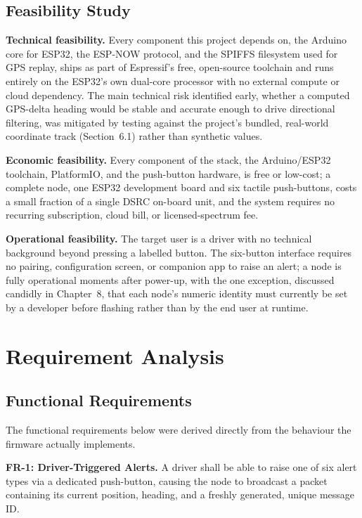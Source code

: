 \documentclass[12pt,a4paper]{report}
\begin{document}
\subsection{Feasibility Study}
\textbf{Technical feasibility.} Every component this project depends on, the Arduino core for ESP32, the ESP-NOW protocol, and the SPIFFS filesystem used for GPS replay, ships as part of Espressif's free, open-source toolchain and runs entirely on the ESP32's own dual-core processor with no external compute or cloud dependency. The main technical risk identified early, whether a computed GPS-delta heading would be stable and accurate enough to drive directional filtering, was mitigated by testing against the project's bundled, real-world coordinate track (Section~6.1) rather than synthetic values.

\textbf{Economic feasibility.} Every component of the stack, the Arduino/ESP32 toolchain, PlatformIO, and the push-button hardware, is free or low-cost; a complete node, one ESP32 development board and six tactile push-buttons, costs a small fraction of a single DSRC on-board unit, and the system requires no recurring subscription, cloud bill, or licensed-spectrum fee.

\textbf{Operational feasibility.} The target user is a driver with no technical background beyond pressing a labelled button. The six-button interface requires no pairing, configuration screen, or companion app to raise an alert; a node is fully operational moments after power-up, with the one exception, discussed candidly in Chapter~8, that each node's numeric identity must currently be set by a developer before flashing rather than by the end user at runtime.

\section{Requirement Analysis}

\subsection{Functional Requirements}
The functional requirements below were derived directly from the behaviour the firmware actually implements.

\textbf{FR-1: Driver-Triggered Alerts.} A driver shall be able to raise one of six alert types via a dedicated push-button, causing the node to broadcast a packet containing its current position, heading, and a freshly generated, unique message ID.
\end{document}

